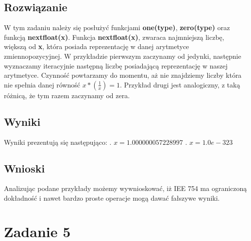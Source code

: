 \documentclass{article}
\begin{document}
\begin{center}
    \subsection{Rozwiązanie}
    \large W tym zadaniu należy się posłużyć funkcjami \textbf{one(type)}, \textbf{zero(type)} oraz funkcją \textbf{nextfloat(x)}.
     Funkcja \textbf{nextfloat(x)}, zwaraca najmniejszą liczbę, większą od \textbf{x}, która posiada reprezentację w danej arytmetyce zmiennopozycyjnej.
     W przykładzie pierwszym zaczynamy od jedynki, następnie wyznaczamy iteracyjnie następną liczbę posiadającą reprezentację w naszej arytmetyce.
     Czynność powtarzamy do momentu, aż nie znajdziemy liczby która nie spełnia danej równość \(\textit{x}*(\frac{1}{\textit{x}}) = 1\).
     Przykład drugi jest analogiczny, z taką różnicą, że tym razem zaczynamy od zera. \newpage
    \subsection{Wyniki}
    \begin{flushleft}
     \large Wyniki prezentują się następująco: . \(x = 1.000000057228997\) . \(x = 1.0e-323\)
    \end{flushleft}
    \subsection{Wnioski}
    \large Analizując podane przykłady możemy wywnioskować, iż IEE 754 ma ograniczoną
     dokładność i nawet bardzo proste operacje mogą dawać fałszywe wyniki.
    \section{Zadanie 5}

\end{center}
\end{document}
